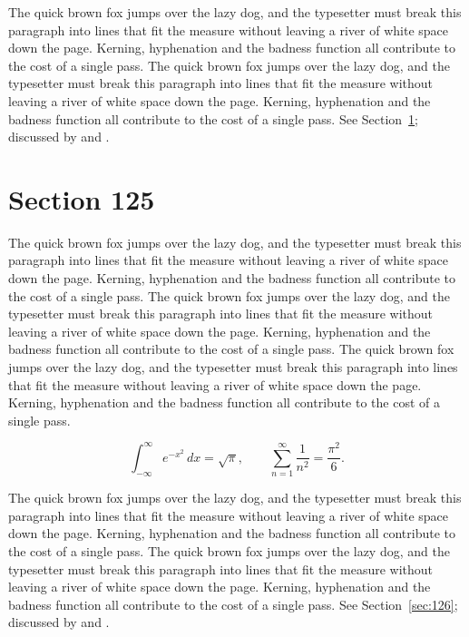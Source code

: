 \documentclass{article}
\begin{document}
The quick brown fox jumps over the lazy dog, and the typesetter must break this paragraph into lines that fit the measure without leaving a river of white space down the page. Kerning, hyphenation and the badness function all contribute to the cost of a single pass. The quick brown fox jumps over the lazy dog, and the typesetter must break this paragraph into lines that fit the measure without leaving a river of white space down the page. Kerning, hyphenation and the badness function all contribute to the cost of a single pass. 
See Section~\ref{sec:125}; discussed by \textcite{k5} and \textcite{l2}.
\section{Section 125}
\label{sec:125}
The quick brown fox jumps over the lazy dog, and the typesetter must break this paragraph into lines that fit the measure without leaving a river of white space down the page. Kerning, hyphenation and the badness function all contribute to the cost of a single pass. The quick brown fox jumps over the lazy dog, and the typesetter must break this paragraph into lines that fit the measure without leaving a river of white space down the page. Kerning, hyphenation and the badness function all contribute to the cost of a single pass. The quick brown fox jumps over the lazy dog, and the typesetter must break this paragraph into lines that fit the measure without leaving a river of white space down the page. Kerning, hyphenation and the badness function all contribute to the cost of a single pass. 

\begin{equation}\label{eq:125}
\int_{-\infty}^{\infty} e^{-x^{2}}\,dx = \sqrt{\pi}, \qquad
\sum_{n=1}^{\infty} \frac{1}{n^{2}} = \frac{\pi^{2}}{6}.
\end{equation}

The quick brown fox jumps over the lazy dog, and the typesetter must break this paragraph into lines that fit the measure without leaving a river of white space down the page. Kerning, hyphenation and the badness function all contribute to the cost of a single pass. The quick brown fox jumps over the lazy dog, and the typesetter must break this paragraph into lines that fit the measure without leaving a river of white space down the page. Kerning, hyphenation and the badness function all contribute to the cost of a single pass. 
See Section~\ref{sec:126}; discussed by \textcite{k1} and \textcite{l3}.
\end{document}
